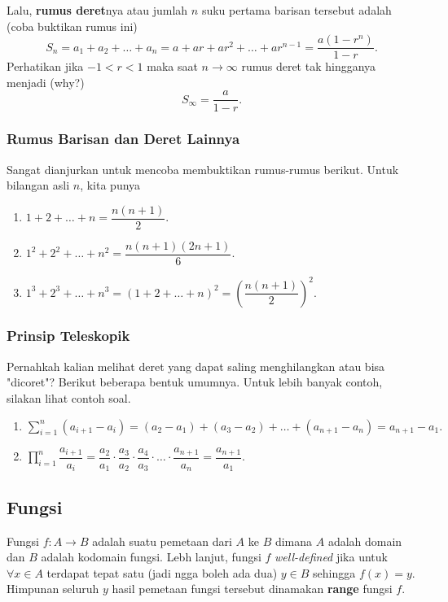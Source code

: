 Lalu, \textbf{rumus deret}nya atau jumlah $n$ suku pertama barisan tersebut adalah (coba buktikan rumus ini) $$S_n = a_1+a_2+\dots+a_n=a+ar+ar^2+\dots+ar^{n-1}=\dfrac{a(1-r^n)}{1-r}.$$
Perhatikan jika $-1 < r < 1$ maka saat $n \rightarrow \infty$ rumus deret tak hingganya menjadi (why?) $$S_\infty =  \dfrac{a}{1-r}.$$
\subsubsection{Rumus Barisan dan Deret Lainnya}
Sangat dianjurkan untuk mencoba membuktikan rumus-rumus berikut. Untuk bilangan asli $n$, kita punya
\begin{enumerate}
    \item $1+2+\dots+n = \dfrac{n(n+1)}{2}.$
    \item $1^2+2^2+\dots+n^2 = \dfrac{n(n+1)(2n+1)}{6}.$
    \item $1^3+2^3+\dots+n^3 = \left(1+2+\dots+n\right)^2= \left(\dfrac{n(n+1)}{2}\right)^2.$
\end{enumerate}

\subsubsection{Prinsip Teleskopik}
Pernahkah kalian melihat deret yang dapat saling menghilangkan atau bisa "dicoret"? Berikut beberapa bentuk umumnya. Untuk lebih banyak contoh, silakan lihat contoh soal.

\begin{enumerate}
    \item $\sum_{i=1}^{n} (a_{i+1}-a_{i}) = (a_2-a_1)+(a_3-a_2)+\dots+(a_{n+1}-a_{n}) = a_{n+1}-a_1.$
    \item $\prod_{i=1}^{n} \dfrac{a_{i+1}}{a_i} =  \dfrac{a_2}{a_1}\cdot\dfrac{a_3}{a_2}\cdot\dfrac{a_4}{a_3}\cdot\ldots\cdot\dfrac{a_{n+1}}{a_n} = \dfrac{a_{n+1}}{a_1}.$
\end{enumerate}

\subsection{Fungsi}
Fungsi $f : A \rightarrow B$ adalah suatu pemetaan dari $A$ ke $B$ dimana $A$ adalah domain dan $B$ adalah kodomain fungsi. Lebh lanjut, fungsi $f$ \textit{well-defined} jika untuk $\forall x \in A$ terdapat tepat satu (jadi ngga boleh ada dua) $y \in B$ sehingga $f(x)=y$. Himpunan seluruh $y$ hasil pemetaan fungsi tersebut dinamakan \textbf{range} fungsi $f$.

